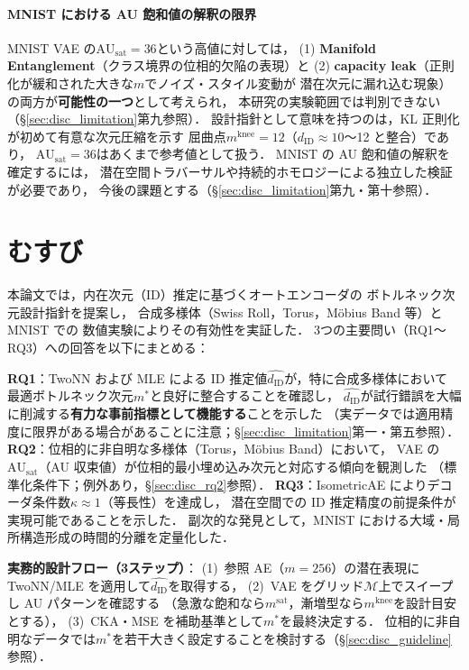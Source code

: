 \documentclass[12pt,a4paper]{jsarticle}
\newcommand{\dID}{d_{\mathrm{ID}}}
\newcommand{\dzopt}{m^*}                    %
\newcommand{\kap}{\kappa}
\newcommand{\AUsat}{\mathrm{AU}_{\mathrm{sat}}}
\newcommand{\dzsat}{m^{\mathrm{sat}}}       %
\newcommand{\mknee}{m^{\mathrm{knee}}}      %
\begin{document}
\paragraph{MNIST における AU 飽和値の解釈の限界}
MNIST VAE の$\AUsat = 36$という高値に対しては，
(1) \textbf{Manifold Entanglement}（クラス境界の位相的欠陥の表現）と
(2) \textbf{capacity leak}（正則化が緩和された大きな$m$でノイズ・スタイル変動が
潜在次元に漏れ込む現象）の両方が\textbf{可能性の一つ}として考えられ，
本研究の実験範囲では判別できない（§\ref{sec:disc_limitation}第九参照）．
設計指針として意味を持つのは，KL 正則化が初めて有意な次元圧縮を示す
屈曲点$\mknee = 12$（$\dID \approx 10$〜12 と整合）であり，
$\AUsat = 36$はあくまで参考値として扱う．
MNIST の AU 飽和値の解釈を確定するには，
潜在空間トラバーサルや持続的ホモロジーによる独立した検証が必要であり，
今後の課題とする（§\ref{sec:disc_limitation}第九・第十参照）．

\section{むすび}\label{sec:conclusion}

本論文では，内在次元（ID）推定に基づくオートエンコーダの
ボトルネック次元設計指針を提案し，
合成多様体（Swiss Roll，Torus，Möbius Band 等）と MNIST での
数値実験によりその有効性を実証した．
3つの主要問い（RQ1〜RQ3）への回答を以下にまとめる：

\textbf{RQ1}：TwoNN および MLE による ID 推定値$\hat{\dID}$が，特に合成多様体において
最適ボトルネック次元$\dzopt$と良好に整合することを確認し，
$\hat{\dID}$が試行錯誤を大幅に削減する\textbf{有力な事前指標として機能する}ことを示した
（実データでは適用精度に限界がある場合があることに注意；§\ref{sec:disc_limitation}第一・第五参照）．
\textbf{RQ2}：位相的に非自明な多様体（Torus，Möbius Band）において，
VAE の$\AUsat$（AU 収束値）が位相的最小埋め込み次元と対応する傾向を観測した
（標準化条件下；例外あり，§\ref{sec:disc_rq2}参照）．
\textbf{RQ3}：IsometricAE によりデコーダ条件数$\kap \approx 1$（等長性）を達成し，
潜在空間での ID 推定精度の前提条件が実現可能であることを示した．
副次的な発見として，MNIST における大域・局所構造形成の時間的分離を定量化した．

\textbf{実務的設計フロー（3ステップ）}：
(1)~参照 AE（$m = 256$）の潜在表現に TwoNN/MLE を適用して$\hat{\dID}$を取得する，
(2)~VAE をグリッド$\mathcal{M}$上でスイープし AU パターンを確認する
（急激な飽和なら$\dzsat$，漸増型なら$\mknee$を設計目安とする），
(3)~CKA・MSE を補助基準として$\dzopt$を最終決定する．
位相的に非自明なデータでは$\dzopt$を若干大きく設定することを検討する（§\ref{sec:disc_guideline}参照）．
\end{document}
